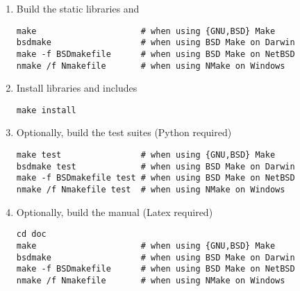 \begin{enumerate}
\item Build the static libraries  and 
\begin{lstlisting}
make                     # when using {GNU,BSD} Make
bsdmake                  # when using BSD Make on Darwin
make -f BSDmakefile      # when using BSD Make on NetBSD
nmake /f Nmakefile       # when using NMake on Windows
\end{lstlisting}
\item Install libraries and includes
\begin{lstlisting}
make install 
\end{lstlisting}
\item Optionally, build the test suites (Python required)
\begin{lstlisting}
make test                # when using {GNU,BSD} Make
bsdmake test             # when using BSD Make on Darwin
make -f BSDmakefile test # when using BSD Make on NetBSD
nmake /f Nmakefile test  # when using NMake on Windows
\end{lstlisting}
\item Optionally, build the manual (Latex required)
\begin{lstlisting}
cd doc
make                     # when using {GNU,BSD} Make
bsdmake                  # when using BSD Make on Darwin
make -f BSDmakefile      # when using BSD Make on NetBSD
nmake /f Nmakefile       # when using NMake on Windows
\end{lstlisting}
\end{enumerate}
